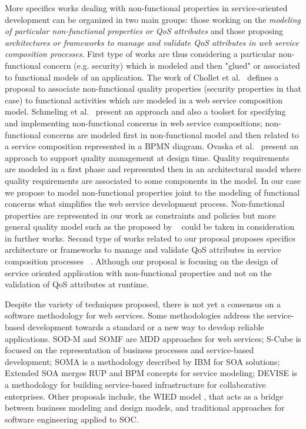 \documentclass{llncs}
\theoremstyle{plain}
\theoremstyle{plain}
\theoremstyle{plain}
\begin{document}
More specifics works dealing with non-functional properties in service-oriented 
development can be organized in two main groups: those working on the \textit{modeling 
of particular non-functional properties or QoS attributes} and those 
proposing \textit{architectures or frameworks to manage and 
validate QoS attributes in web service composition processes}. 
First type of works are thus considering a particular non-functional concern (e.g. security)
which is modeled and then "glued" or associated to functional models of an application. 
The work of Chollet et al.~\cite{CholletL09} defines a proposal to associate non-functional 
quality properties (security properties in that case) to functional activities which are modeled 
in a web service composition model. Schmeling et al.~\cite{SchmelingCM11} present 
an approach and also a toolset for specifying and implementing non-functional 
concerns in web service compositions; non-functional concerns are modeled first 
in non-functional model and then related to a service composition 
represented in a BPMN diagram. Ovaska et al.~\cite{OvaskaEHPA10} present an approach to 
support quality management at design time. Quality requirements are modeled in a first phase 
and represented then in an architectural model where quality requirements are associated to some
components in the model. In our case we propose to model non-functional properties joint 
to the modeling of functional concerns what simplifies the web service development process. 
Non-functional properties are represented in our work as constraints and policies 
but more general quality model such as the proposed by ~\cite{Goeb2011,Klass2009} 
could be taken in consideration in further works. Second type of works related to 
our proposal proposes specifics architecture or frameworks to manage and validate 
QoS attributes in service composition processes ~\cite{XiaoCZBOLH08,Babamir2010,Karunamurthy2012787}. 
Although our proposal is focusing on the design of service oriented application with non-functional 
properties and not on the validation of QoS attributes at runtime.

Despite the variety of techniques proposed, there is not yet a consensus on a software methodology 
for web services. Some methodologies address the service-based 
development towards a standard or a new way to develop reliable applications. 
SOD-M and SOMF \cite{somf} are MDD approaches for web services; 
S-Cube \cite{scube2010book} is focused on the representation of business processes and 
service-based development; SOMA \cite{soma} is a methodology described by IBM
for SOA solutions; Extended SOA \cite{PapazoglouH06} merges RUP and
BPM\cite{bpm} concepts for service modeling; DEVISE \cite{DEVISE} is a
methodology for building service-based infrastructure for collaborative
enterprises. Other proposals include, the WIED model \cite{TongrungrojanaL04}, 
that acts as a bridge between business modeling and design models, and traditional 
approaches for software engineering \cite{sommerville08} applied to SOC.
\end{document}
